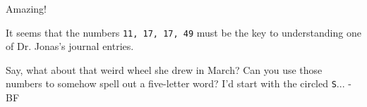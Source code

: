 Amazing!

It seems that the numbers \texttt{11, 17, 17, 49} must be the key
to understanding one of Dr. Jonas's journal entries.

Say, what about that weird wheel she drew in March? Can you use those
numbers to somehow spell out a five-letter word? I'd start with the
circled \texttt{S}... -BF

